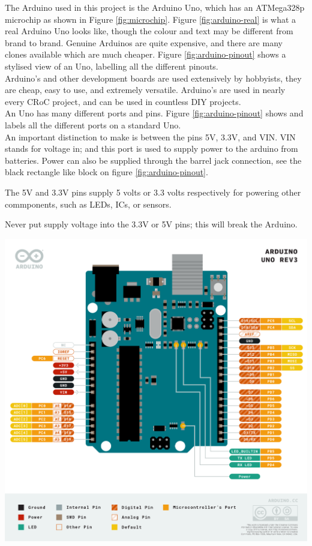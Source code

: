 \documentclass[a4paper,12pt]{article}
\begin{document}
The Arduino used in this project is the Arduino Uno, which has an ATMega328p microchip as shown in Figure \ref{fig:microchip}. Figure \ref{fig:arduino-real} is what a real Arduino Uno looks like, though the colour and text may be different from brand to brand. Genuine Arduinos are quite expensive, and there are many clones available which are much cheaper. Figure \ref{fig:arduino-pinout} shows a stylised view of an Uno, labelling all the different pinouts. \\

Arduino's and other development boards are used extensively by hobbyists, they are cheap, easy to use, and extremely versatile. Arduino's are used in nearly every CRoC project, and can be used in countless DIY projects. \\


An Uno has many different ports and pins. Figure \ref{fig:arduino-pinout} shows and labels all the different ports on a standard Uno. \\

An important distinction to make is between the pins 5V, 3.3V, and VIN. VIN stands for voltage in; and this port is used to supply power to the arduino from batteries. Power can also be supplied through the barrel jack connection, see the black rectangle like block on figure \ref{fig:arduino-pinout}. 

The 5V and 3.3V  pins supply 5 volts or 3.3 volts respectively for powering other commponents, such as LEDs, ICs, or sensors.  

\begin{warningbox}
    Never put supply voltage into the 3.3V or 5V pins; this will break the Arduino. 
\end{warningbox}


\begin{center}
    \includegraphics[width=0.8\linewidth]{Pinout-UNOrev3_latest.png}
    \label{fig:arduino-pinout}
\end{center}
\end{document}
